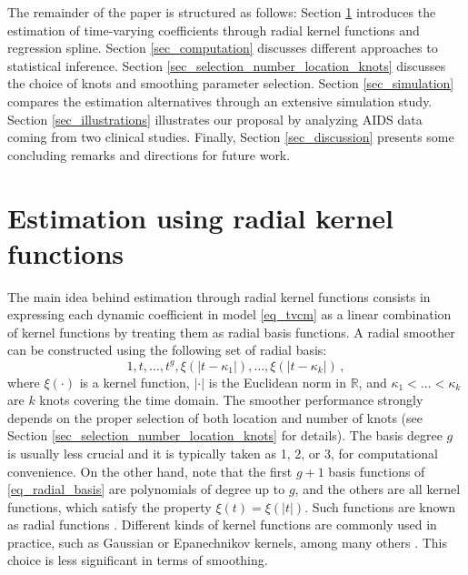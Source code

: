 \documentclass[letterpaper,10pt,openany]{article}
\def\reals{\mathbb{R}}
\begin{document}
The remainder of the paper is structured as follows:
Section \ref{sec_estimation} introduces the estimation of time-varying coefficients through radial kernel functions and regression spline. Section \ref{sec_computation} discusses different approaches to statistical inference. Section \ref{sec_selection_number_location_knots} discusses the choice of knots and smoothing parameter selection. Section \ref{sec_simulation} compares the estimation alternatives through an extensive simulation study. Section \ref{sec_illustrations} illustrates our proposal by analyzing AIDS data coming from two clinical studies. Finally, Section \ref{sec_discussion} presents some concluding remarks and directions for future work.


\section{Estimation using radial kernel functions}\label{sec_estimation}


The main idea behind estimation through radial kernel functions consists in expressing each dynamic coefficient in model \eqref{eq_tvcm} as a linear combination of kernel functions by treating them as radial basis functions. A radial smoother can be constructed using the following set of radial basis:
\begin{equation}\label{eq_radial_basis}
1, t, \ldots, t^g, \xi(|t-\kappa_1|),\ldots,\xi(|t-\kappa_k|)\,,
\end{equation}
where $\xi(\cdot)$ is a kernel function, $|\cdot|$ is the Euclidean norm in $\reals$, and $\kappa_1<\ldots<\kappa_k$ are $k$ knots covering the time domain. The smoother performance strongly depends on the proper selection of both location and number of knots (see Section \ref{sec_selection_number_location_knots} for details). The basis degree $g$ is usually less crucial and it is typically taken as 1, 2, or 3, for computational convenience. On the other hand, note that the first $g + 1$ basis functions of \eqref{eq_radial_basis} are polynomials of degree up to $g$, and the others are all kernel functions, which satisfy the property $\xi(t) = \xi(|t|)$. Such functions are known as radial functions \citep{buhmann-04}. Different kinds of kernel functions are commonly used in practice, such as Gaussian or Epanechnikov kernels, among many others \citep[see][for a review]{wasserman-06}. This choice is less significant in terms of smoothing.
\end{document}
